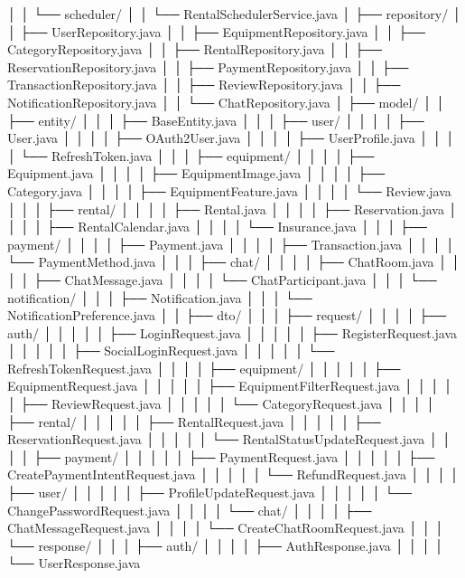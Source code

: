 │   │   └── scheduler/
│   │       └── RentalSchedulerService.java
│   ├── repository/
│   │   ├── UserRepository.java
│   │   ├── EquipmentRepository.java
│   │   ├── CategoryRepository.java
│   │   ├── RentalRepository.java
│   │   ├── ReservationRepository.java
│   │   ├── PaymentRepository.java
│   │   ├── TransactionRepository.java
│   │   ├── ReviewRepository.java
│   │   ├── NotificationRepository.java
│   │   └── ChatRepository.java
│   ├── model/
│   │   ├── entity/
│   │   │   ├── BaseEntity.java
│   │   │   ├── user/
│   │   │   │   ├── User.java
│   │   │   │   ├── OAuth2User.java
│   │   │   │   ├── UserProfile.java
│   │   │   │   └── RefreshToken.java
│   │   │   ├── equipment/
│   │   │   │   ├── Equipment.java
│   │   │   │   ├── EquipmentImage.java
│   │   │   │   ├── Category.java
│   │   │   │   ├── EquipmentFeature.java
│   │   │   │   └── Review.java
│   │   │   ├── rental/
│   │   │   │   ├── Rental.java
│   │   │   │   ├── Reservation.java
│   │   │   │   ├── RentalCalendar.java
│   │   │   │   └── Insurance.java
│   │   │   ├── payment/
│   │   │   │   ├── Payment.java
│   │   │   │   ├── Transaction.java
│   │   │   │   └── PaymentMethod.java
│   │   │   ├── chat/
│   │   │   │   ├── ChatRoom.java
│   │   │   │   ├── ChatMessage.java
│   │   │   │   └── ChatParticipant.java
│   │   │   └── notification/
│   │   │       ├── Notification.java
│   │   │       └── NotificationPreference.java
│   │   ├── dto/
│   │   │   ├── request/
│   │   │   │   ├── auth/
│   │   │   │   │   ├── LoginRequest.java
│   │   │   │   │   ├── RegisterRequest.java
│   │   │   │   │   ├── SocialLoginRequest.java
│   │   │   │   │   └── RefreshTokenRequest.java
│   │   │   │   ├── equipment/
│   │   │   │   │   ├── EquipmentRequest.java
│   │   │   │   │   ├── EquipmentFilterRequest.java
│   │   │   │   │   ├── ReviewRequest.java
│   │   │   │   │   └── CategoryRequest.java
│   │   │   │   ├── rental/
│   │   │   │   │   ├── RentalRequest.java
│   │   │   │   │   ├── ReservationRequest.java
│   │   │   │   │   └── RentalStatusUpdateRequest.java
│   │   │   │   ├── payment/
│   │   │   │   │   ├── PaymentRequest.java
│   │   │   │   │   ├── CreatePaymentIntentRequest.java
│   │   │   │   │   └── RefundRequest.java
│   │   │   │   ├── user/
│   │   │   │   │   ├── ProfileUpdateRequest.java
│   │   │   │   │   └── ChangePasswordRequest.java
│   │   │   │   └── chat/
│   │   │   │       ├── ChatMessageRequest.java
│   │   │   │       └── CreateChatRoomRequest.java
│   │   │   └── response/
│   │   │       ├── auth/
│   │   │       │   ├── AuthResponse.java
│   │   │       │   └── UserResponse.java
